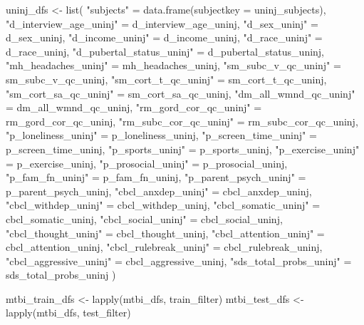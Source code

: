 \documentclass[
  letterpaper,
  DIV=11,
  numbers=noendperiod]{scrreprt}
\newenvironment{Shaded}{\begin{snugshade}}{\end{snugshade}}
\newcommand{\AttributeTok}[1]{\textcolor[rgb]{0.40,0.45,0.13}{#1}}
\newcommand{\FunctionTok}[1]{\textcolor[rgb]{0.28,0.35,0.67}{#1}}
\newcommand{\NormalTok}[1]{\textcolor[rgb]{0.00,0.23,0.31}{#1}}
\newcommand{\OtherTok}[1]{\textcolor[rgb]{0.00,0.23,0.31}{#1}}
\newcommand{\StringTok}[1]{\textcolor[rgb]{0.13,0.47,0.30}{#1}}
\begin{document}
\begin{Shaded}
\begin{Highlighting}[]
\NormalTok{uninj\_dfs }\OtherTok{\textless{}{-}} \FunctionTok{list}\NormalTok{(}
    \StringTok{"subjects"} \OtherTok{=} \FunctionTok{data.frame}\NormalTok{(}\AttributeTok{subjectkey =}\NormalTok{ uninj\_subjects),}
    \StringTok{"d\_interview\_age\_uninj"} \OtherTok{=}\NormalTok{ d\_interview\_age\_uninj,}
    \StringTok{"d\_sex\_uninj"} \OtherTok{=}\NormalTok{ d\_sex\_uninj,}
    \StringTok{"d\_income\_uninj"} \OtherTok{=}\NormalTok{ d\_income\_uninj,}
    \StringTok{"d\_race\_uninj"} \OtherTok{=}\NormalTok{ d\_race\_uninj,}
    \StringTok{"d\_pubertal\_status\_uninj"} \OtherTok{=}\NormalTok{ d\_pubertal\_status\_uninj,}
    \StringTok{"mh\_headaches\_uninj"} \OtherTok{=}\NormalTok{ mh\_headaches\_uninj,}
    \StringTok{"sm\_subc\_v\_qc\_uninj"} \OtherTok{=}\NormalTok{ sm\_subc\_v\_qc\_uninj,}
    \StringTok{"sm\_cort\_t\_qc\_uninj"} \OtherTok{=}\NormalTok{ sm\_cort\_t\_qc\_uninj,}
    \StringTok{"sm\_cort\_sa\_qc\_uninj"} \OtherTok{=}\NormalTok{ sm\_cort\_sa\_qc\_uninj,}
    \StringTok{"dm\_all\_wmnd\_qc\_uninj"} \OtherTok{=}\NormalTok{ dm\_all\_wmnd\_qc\_uninj,}
    \StringTok{"rm\_gord\_cor\_qc\_uninj"} \OtherTok{=}\NormalTok{ rm\_gord\_cor\_qc\_uninj,}
    \StringTok{"rm\_subc\_cor\_qc\_uninj"} \OtherTok{=}\NormalTok{ rm\_subc\_cor\_qc\_uninj,}
    \StringTok{"p\_loneliness\_uninj"} \OtherTok{=}\NormalTok{ p\_loneliness\_uninj,}
    \StringTok{"p\_screen\_time\_uninj"} \OtherTok{=}\NormalTok{ p\_screen\_time\_uninj,}
    \StringTok{"p\_sports\_uninj"} \OtherTok{=}\NormalTok{ p\_sports\_uninj,}
    \StringTok{"p\_exercise\_uninj"} \OtherTok{=}\NormalTok{ p\_exercise\_uninj,}
    \StringTok{"p\_prosocial\_uninj"} \OtherTok{=}\NormalTok{ p\_prosocial\_uninj,}
    \StringTok{"p\_fam\_fn\_uninj"} \OtherTok{=}\NormalTok{ p\_fam\_fn\_uninj,}
    \StringTok{"p\_parent\_psych\_uninj"} \OtherTok{=}\NormalTok{ p\_parent\_psych\_uninj,}
    \StringTok{"cbcl\_anxdep\_uninj"} \OtherTok{=}\NormalTok{ cbcl\_anxdep\_uninj,}
    \StringTok{"cbcl\_withdep\_uninj"} \OtherTok{=}\NormalTok{ cbcl\_withdep\_uninj,}
    \StringTok{"cbcl\_somatic\_uninj"} \OtherTok{=}\NormalTok{ cbcl\_somatic\_uninj,}
    \StringTok{"cbcl\_social\_uninj"} \OtherTok{=}\NormalTok{ cbcl\_social\_uninj,}
    \StringTok{"cbcl\_thought\_uninj"} \OtherTok{=}\NormalTok{ cbcl\_thought\_uninj,}
    \StringTok{"cbcl\_attention\_uninj"} \OtherTok{=}\NormalTok{ cbcl\_attention\_uninj,}
    \StringTok{"cbcl\_rulebreak\_uninj"} \OtherTok{=}\NormalTok{ cbcl\_rulebreak\_uninj,}
    \StringTok{"cbcl\_aggressive\_uninj"} \OtherTok{=}\NormalTok{ cbcl\_aggressive\_uninj,}
    \StringTok{"sds\_total\_probs\_uninj"} \OtherTok{=}\NormalTok{ sds\_total\_probs\_uninj}
\NormalTok{)}

\NormalTok{mtbi\_train\_dfs }\OtherTok{\textless{}{-}} \FunctionTok{lapply}\NormalTok{(mtbi\_dfs, train\_filter)}
\NormalTok{mtbi\_test\_dfs }\OtherTok{\textless{}{-}} \FunctionTok{lapply}\NormalTok{(mtbi\_dfs, test\_filter)}
\end{Highlighting}
\end{Shaded}
\end{document}
